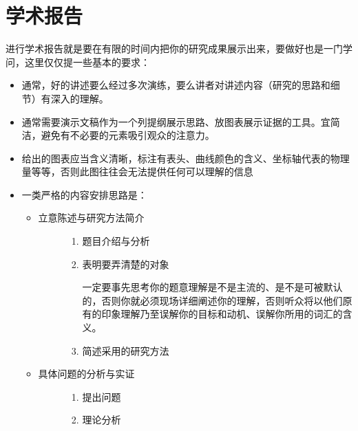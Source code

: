 \documentclass[a4paper,10pt,english]{sphinxmanual}
\begin{document}
\section{学术报告}
\label{\detokenize{7. Tournament:id15}}
进行学术报告就是要在有限的时间内把你的研究成果展示出来，要做好也是一门学问，这里仅仅提一些基本的要求：
\begin{itemize}
\item {} 
通常，好的讲述要么经过多次演练，要么讲者对讲述内容（研究的思路和细节）有深入的理解。

\item {} 
通常需要演示文稿作为一个列提纲展示思路、放图表展示证据的工具。宜简洁，避免有不必要的元素吸引观众的注意力。

\item {} 
给出的图表应当含义清晰，标注有表头、曲线颜色的含义、坐标轴代表的物理量等等，否则此图往往会无法提供任何可以理解的信息

\item {} 
一类严格的内容安排思路是：
\begin{itemize}
\item {} \begin{description}
\item[{立意陈述与研究方法简介}] \leavevmode\begin{enumerate}
\item {} 
题目介绍与分析

\item {} 
表明要弄清楚的对象 %
\begin{footnote}[3]\sphinxAtStartFootnote
一定要事先思考你的题意理解是不是主流的、是不是可被默认的，否则你就必须现场详细阐述你的理解，否则听众将以他们原有的印象理解乃至误解你的目标和动机、误解你所用的词汇的含义。
%
\end{footnote}

\item {} 
简述采用的研究方法

\end{enumerate}

\end{description}

\item {} \begin{description}
\item[{具体问题的分析与实证}] \leavevmode\begin{enumerate}
\item {} 
提出问题

\item {} 
理论分析


\end{enumerate}
\end{description}
\end{itemize}
\end{itemize}
\end{document}
